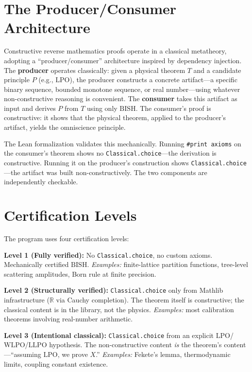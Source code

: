 \documentclass[11pt,a4paper]{report}
\theoremstyle{plain}
\theoremstyle{definition}
\theoremstyle{remark}
\newcommand{\BISH}{\mathrm{BISH}}
\newcommand{\LLPO}{\mathrm{LLPO}}
\newcommand{\WLPO}{\mathrm{WLPO}}
\newcommand{\LPO}{\mathrm{LPO}}
\newcommand{\RR}{\mathbb{R}}
\begin{document}
\section{The Producer/Consumer Architecture}

Constructive reverse mathematics proofs operate in a classical metatheory, adopting a ``producer/consumer'' architecture inspired by dependency injection. The \textbf{producer} operates classically: given a physical theorem $T$ and a candidate principle $P$ (e.g., $\LPO$), the producer constructs a concrete artifact---a specific binary sequence, bounded monotone sequence, or real number---using whatever non-constructive reasoning is convenient. The \textbf{consumer} takes this artifact as input and derives $P$ from $T$ using only $\BISH$. The consumer's proof is constructive: it shows that the physical theorem, applied to the producer's artifact, yields the omniscience principle.

The Lean formalization validates this mechanically. Running \texttt{\#print axioms} on the consumer's theorem shows no \texttt{Classical.choice}---the derivation is constructive. Running it on the producer's construction shows \texttt{Classical.choice}---the artifact was built non-constructively. The two components are independently checkable.

\section{Certification Levels}

The program uses four certification levels:

\textbf{Level 1 (Fully verified):} No \texttt{Classical.choice}, no custom axioms. Mechanically certified $\BISH$. \emph{Examples:} finite-lattice partition functions, tree-level scattering amplitudes, Born rule at finite precision.

\textbf{Level 2 (Structurally verified):} \texttt{Classical.choice} only from Mathlib infrastructure ($\RR$ via Cauchy completion). The theorem itself is constructive; the classical content is in the library, not the physics. \emph{Examples:} most calibration theorems involving real-number arithmetic.

\textbf{Level 3 (Intentional classical):} \texttt{Classical.choice} from an explicit $\LPO$/$\WLPO$/$\LLPO$ hypothesis. The non-constructive content \emph{is} the theorem's content---``assuming $\LPO$, we prove $X$.'' \emph{Examples:} Fekete's lemma, thermodynamic limits, coupling constant existence.
\end{document}
